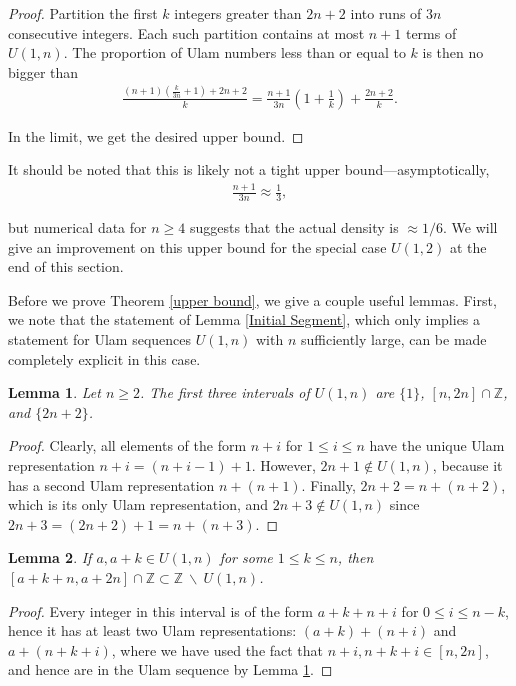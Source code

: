 \documentclass{amsart}
\newcommand{\ZZ}{\mathbb{Z}}
\theoremstyle{theorem}
\newtheorem{lemma}{Lemma}[section]
\theoremstyle{definition}
\begin{document}
\begin{proof}
Partition the first $k$ integers greater than $2n + 2$ into runs of $3n$ consecutive integers. Each such partition contains at most $n + 1$ terms of $U(1,n)$. The proportion of Ulam numbers less than or equal to $k$ is then no bigger than
	\begin{align*}
    \frac{(n + 1)(\frac{k}{3n} + 1) + 2n + 2}{k} = \frac{n + 1}{3n}\left(1 + \frac{1}{k}\right) + \frac{2n + 2}{k}.
    \end{align*}
    
\noindent In the limit, we get the desired upper bound.
\end{proof}

It should be noted that this is likely not a tight upper bound---asymptotically,
\begin{align*}
\frac{n+1}{3n}\approx\frac{1}{3},
\end{align*}

\noindent but numerical data for $n \geq 4$ suggests that the actual density is $\approx 1/6$. We will give an improvement on this upper bound for the special case $U(1,2)$ at the end of this section.

Before we prove Theorem \ref{upper bound}, we give a couple useful lemmas. First, we note that the statement of Lemma \ref{Initial Segment}, which only implies a statement for Ulam sequences $U(1,n)$ with $n$ sufficiently large, can be made completely explicit in this case.

\begin{lemma}\label{Initial Segment Explicit}
Let $n \geq 2$. The first three intervals of $U(1,n)$ are $\{1\}$, $[n,2n]\cap \ZZ$, and $\{2n+2\}$.
\end{lemma}

\begin{proof}
Clearly, all elements of the form $n+i$ for $1 \leq i \leq n$ have the unique Ulam representation $n+i = (n+i-1) + 1$. However, $2n+1 \notin U(1,n)$, because it has a second Ulam representation $n + (n+1)$. Finally, $2n+2 = n + (n+2)$, which is its only Ulam representation, and $2n + 3 \notin U(1,n)$ since $2n + 3 = (2n + 2) + 1 = n + (n + 3)$.
\end{proof}

\begin{lemma}\label{sieve1}
If $a,a + k \in U(1,n)$ for some $1\leq k\leq n$, then $[a + k + n, a + 2n] \cap \ZZ \subset \ZZ \ \backslash \ U(1,n)$.
\end{lemma}

\begin{proof}
Every integer in this interval is of the form $a+k+n+i$ for $0\leq i\leq n - k$, hence it has at least two Ulam representations: $(a+k)+(n+i)$ and $a + (n+k+i)$, where we have used the fact that $n + i, n + k + i \in [n, 2n]$, and hence are in the Ulam sequence by Lemma \ref{Initial Segment Explicit}.
\end{proof}
\end{document}
